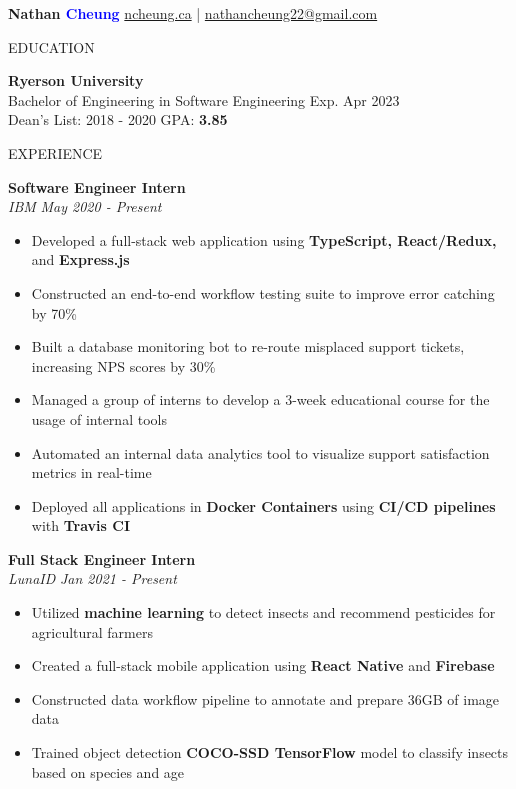 \documentclass[letterpaper,11pt,oneside]{article}
\newcommand{\createHeading}[1]{
    \vspace{1.25em}
    \hline
    \vspace{-1.5ex}
    \begin{center}
        #1
    \end{center}
    \vspace{-1.5ex}
    \hline
    \vspace{1.25em}
}
\begin{document}

\noindent \huge{\textbf{Nathan \textcolor{blue}{Cheung}}} \hfill \normalsize{\href{https://ncheung.ca}{ncheung.ca} | \href{mailto:nathancheung22@gmail.com}{nathancheung22@gmail.com}}




\createHeading{EDUCATION}
\begin{addmargin}[.6em]{.6em}
    \textbf{Ryerson University} \\
    Bachelor of Engineering in Software Engineering \hfill Exp. Apr 2023 \\
    Dean's List: 2018 - 2020 \hfill GPA: \textbf{3.85}
\end{addmargin}

\createHeading{EXPERIENCE}
\begin{addmargin}[.6em]{.6em}
    \textbf{Software Engineer Intern} \\
    \textit{IBM} \hfill \textit{May 2020 - Present}
    \begin{itemize}
        \item Developed a full-stack web application using \textbf{TypeScript, React/Redux,} and \textbf{Express.js}
        \item Constructed an end-to-end workflow testing suite to improve error catching by 70\%
        \item Built a database monitoring bot to re-route misplaced support tickets, increasing NPS scores by 30\%
        \item Managed a group of interns to develop a 3-week educational course for the usage of internal tools
        \item Automated an internal data analytics tool to visualize support satisfaction metrics in real-time
        \item Deployed all applications in \textbf{Docker Containers} using \textbf{CI/CD pipelines} with \textbf{Travis CI}
    \end{itemize}
    \vspace{1.25em}
    \textbf{Full Stack Engineer Intern} \\
    \textit{LunaID} \hfill \textit{Jan 2021 - Present}
    \begin{itemize}
        \item Utilized \textbf{machine learning} to detect insects and recommend pesticides for agricultural farmers
        \item Created a full-stack mobile application using \textbf{React Native} and \textbf{Firebase}
        \item Constructed data workflow pipeline to annotate and prepare 36GB of image data
        \item Trained object detection \textbf{COCO-SSD TensorFlow} model to classify insects based on species and age
    \end{itemize}
    \vspace{0.5em}
\end{addmargin}
\end{document}

